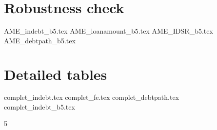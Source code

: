 \documentclass[a4paper, 11pt, onecolumn]{article}
\begin{document}
\clearpage
\newpage
\section{Robustness check}
\label{app:rob}

{AME_indebt_b5.tex}
{AME_loanamount_b5.tex}
{AME_IDSR_b5.tex}
{AME_debtpath_b5.tex}



\clearpage
\newpage
\section{Detailed tables}
\label{app:rob}
{complet_indebt.tex}
\clearpage
\newpage
{complet_fe.tex}
\clearpage
\newpage
{complet_debtpath.tex}
\clearpage
\newpage
{complet_indebt_b5.tex}



\clearpage
\newpage
\setcounter{tocdepth}5
\tableofcontents

\end{document}
